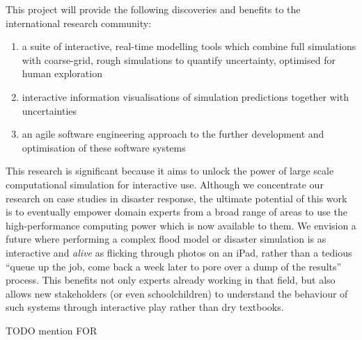 \documentclass[a4paper,fontsize=12pt]{scrartcl}
\begin{document}
This project will provide the following discoveries and benefits to
the international research community:
\begin{enumerate}

\item a suite of interactive, real-time modelling tools which combine
full simulations with coarse-grid, rough simulations to quantify
uncertainty, optimised for human exploration

\item interactive information visualisations of simulation predictions
together with uncertainties



\item an agile software engineering approach to the further development
and optimisation of these software systems

\end{enumerate}

This research is significant because it aims to unlock the power of
large scale 
computational simulation for interactive use. Although we concentrate
our research on case studies in disaster response, the
ultimate potential of this work is to eventually empower domain
experts from a broad range of areas to use the high-performance
computing power which is now available to them. We envision a future
where performing a complex flood model or disaster simulation is as
interactive and \emph{alive} as flicking through photos on an iPad,
rather than a tedious ``queue up the job, come back a week later to
pore over a dump of the results'' process. This benefits not only
experts already working in that field, but also allows new stakeholders
(or even schoolchildren) to understand the behaviour of such systems
through interactive play rather than dry textbooks.

TODO mention FOR
\end{document}
